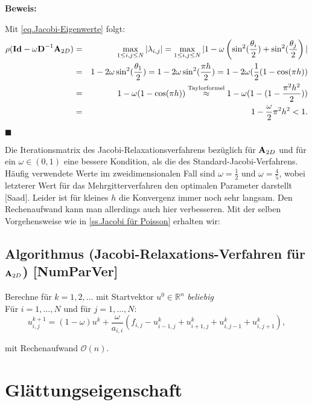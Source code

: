 \textbf{Beweis:}\label{b.Spektral JacobiRelax}

Mit \autoref{eq.Jacobi-Eigenwerte} folgt:
\begin{eqnarray}
\rho({\textbf{Id}}-\omega{\textbf{D}}^{-1}{\textbf{A}}_{2D}) &=& \max_{1 \le i,j \le N} | \lambda_{i,j} | = \max_{1 \le i,j \le N} | 1 - \omega \left(\sin^{2}(\frac {\theta_{i}} {2}) + \sin^{2}(\frac {\theta_{j}} {2} \right) | \notag \\
&=& 1 - 2 \omega \sin^{2} (\frac {\theta_{1}} {2}) = 1 - 2 \omega \sin^{2} (\frac {\pi h} {2}) = 1 - 2 \omega (\frac{1} {2} (1 - \cos (\pi h)) \notag \\
&=& 1 - \omega(1 - \cos (\pi h)) \overset{\textnormal{Taylorformel}}{\approx} 1 - \omega(1-(1-\frac{\pi^{2} h^{2}}{2})) \notag \\
&=& 1 - \frac {\omega} {2} \pi^{2} h^{2} < 1. \notag
\end{eqnarray}
\begin{flushright}
$\blacksquare$
\end{flushright}

Die Iterationsmatrix des Jacobi-Relaxationsverfahrens bezüglich für ${\textbf{A}}_{2D}$ und für ein $\omega \in (0,1)$ eine bessere Kondition, als die des Standard-Jacobi-Verfahrens. Häufig verwendete Werte im zweidimensionalen Fall sind $\omega = \frac {1} {2}$ und $\omega = \frac {4} {5}$, wobei letzterer Wert für das Mehrgitterverfahren den optimalen Parameter darstellt [Saad]. Leider ist für kleines $h$ die Konvergenz immer noch sehr langsam. Den Rechenaufwand kann man allerdings auch hier verbesseren. Mit der selben Vorgehensweise wie in \autoref{ss.Jacobi für Poisson} erhalten wir:

\subsection{Algorithmus (Jacobi-Relaxations-Verfahren für ${\textbf{A}}_{2D}$) [NumParVer]}\label{ss.Algorithmus Jacobi Relax Poisson}

Berechne für $k = 1,2,...$ mit Startvektor $u^{0} \in \mathbb{R}^{n}$ \textit{beliebig}\\
Für $i = 1,...,N$ und für $j = 1,...,N$:
\begin{equation}
u^{k+1}_{i,j} = (1 - \omega)u^{k} + \frac {\omega} {a_{i,i}} (f_{i,j} - u^{k}_{i-1,j} + u^{k}_{i+1,j} + u^{k}_{i,j-1} + u^{k}_{i,j+1}),
\end{equation}

mit Rechenaufwand $\mathcal{O}(n)$.

\section{Glättungseigenschaft}\label{s.Glättungseigenschaft}

